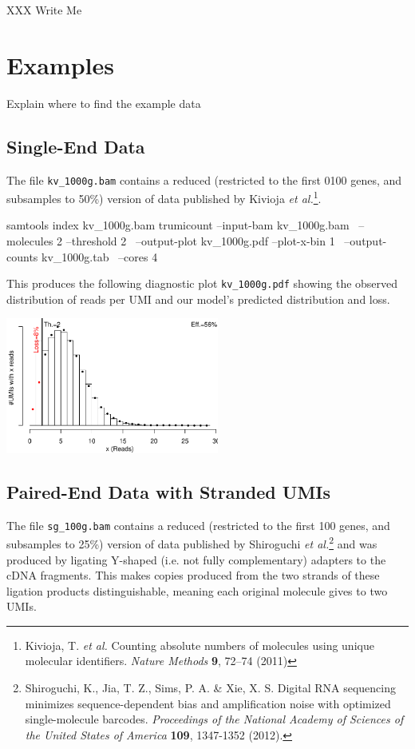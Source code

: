\documentclass[10pt]{article}
\begin{document}
XXX Write Me

\section{Examples}

Explain where to find the example data

\subsection*{Single-End Data}

The file \texttt{kv\_1000g.bam} contains a reduced (restricted to the first 0100 genes, and subsamples to 50\%) version of data published by Kivioja \textit{et al.}\footnote{Kivioja, T. \textit{et al.} Counting absolute numbers of molecules using unique molecular identifiers. \textit{Nature Methods} \textbf{9}, 72–74 (2011)}.

\begin{shellcode}
samtools index kv_1000g.bam
trumicount --input-bam kv_1000g.bam \
  --molecules 2 --threshold 2 \
  --output-plot kv_1000g.pdf --plot-x-bin 1 \
  --output-counts kv_1000g.tab \
  --cores 4
\end{shellcode}

This produces the following diagnostic plot \texttt{kv\_1000g.pdf} showing the observed distribution of reads per UMI and our model's predicted distribution and loss.

{\centering \includegraphics[width=7cm]{../examples/kv_1000g.pdf}\\}

\subsection{Paired-End Data with Stranded UMIs}

The file \texttt{sg\_100g.bam} contains a reduced (restricted to the first 100 genes, and subsamples to 25\%) version of data published by Shiroguchi \textit{et al.}\footnote{Shiroguchi, K., Jia, T. Z., Sims, P. A. \& Xie, X. S. Digital RNA sequencing minimizes sequence-dependent bias and amplification noise with optimized single-molecule barcodes. \textit{Proceedings of the National Academy of Sciences of the United States of America} \textbf{109}, 1347-1352 (2012).} and was produced by ligating Y-shaped (i.e. not fully complementary) adapters to the cDNA fragments. This makes copies produced from the two strands of these ligation products distinguishable, meaning each original molecule gives to two UMIs. 
\end{document}
